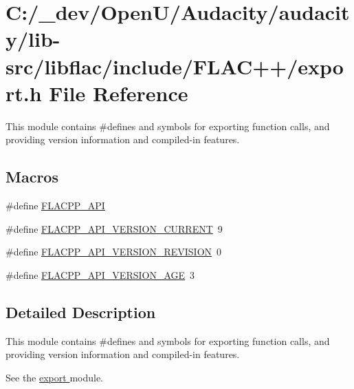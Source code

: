 \hypertarget{lib-src_2libflac_2include_2_f_l_a_c_09_09_2export_8h}{}\section{C\+:/\+\_\+dev/\+Open\+U/\+Audacity/audacity/lib-\/src/libflac/include/\+F\+L\+A\+C++/export.h File Reference}
\label{lib-src_2libflac_2include_2_f_l_a_c_09_09_2export_8h}


This module contains \#defines and symbols for exporting function calls, and providing version information and compiled-\/in features.  


\subsection*{Macros}
\begin{DoxyCompactItemize}
\item 
\#define \hyperlink{group__flacpp__export_gaec3a801bf18630403eda6dc2f8c4927a}{F\+L\+A\+C\+P\+P\+\_\+\+A\+PI}
\item 
\#define \hyperlink{group__flacpp__export_gafc3064beba20c1795d8aaa801b79d3b6}{F\+L\+A\+C\+P\+P\+\_\+\+A\+P\+I\+\_\+\+V\+E\+R\+S\+I\+O\+N\+\_\+\+C\+U\+R\+R\+E\+NT}~9
\item 
\#define \hyperlink{group__flacpp__export_gaebce36e5325dbdcdc1a9e61a44606efe}{F\+L\+A\+C\+P\+P\+\_\+\+A\+P\+I\+\_\+\+V\+E\+R\+S\+I\+O\+N\+\_\+\+R\+E\+V\+I\+S\+I\+ON}~0
\item 
\#define \hyperlink{group__flacpp__export_ga17d0e89a961696b32c2b11e08663543f}{F\+L\+A\+C\+P\+P\+\_\+\+A\+P\+I\+\_\+\+V\+E\+R\+S\+I\+O\+N\+\_\+\+A\+GE}~3
\end{DoxyCompactItemize}


\subsection{Detailed Description}
This module contains \#defines and symbols for exporting function calls, and providing version information and compiled-\/in features. 

See the \hyperlink{group__flacpp__export}{export } module. 